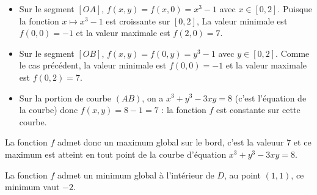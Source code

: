 {\begin{enumerate}
\begin{enumerate}
{\begin{itemize}
    			\item Sur le segment $[OA]$, $f(x,y) = f(x,0) = x^3 - 1$ avec $x \in [0,2]$. Puisque la fonction $x \mapsto x^3-1$ est croissante sur $[0,2]$, La valeur minimale est $f(0,0) = -1$ et la valeur maximale est $f(2,0) = 7$. 
    			\item Sur le segment $[OB]$, $f(x,y) = f(0,y) = y^3 - 1$ avec $y \in [0,2]$. Comme le cas précédent, la valeur minimale est $f(0,0) = -1$ et la valeur maximale est $f(0,2) = 7$.
    			\item Sur la portion de courbe $(AB)$, on a $x^3 + y^3 - 3xy = 8$  (c'est l'équation de la courbe) donc $f(x,y) = 8-1 = 7$ : la fonction $f$ est constante sur cette courbe. 
    		\end{itemize}	
    	La fonction $f$ admet donc un maximum global sur le bord, c'est la valeuur $7$ et ce maximum est atteint en tout point de la courbe d'équation $x^3 + y^3 - 3xy = 8$. 
    	
    	La fonction $f$ admet un minimum global à l'intérieur de $D$, au point $(1,1)$, ce minimum vaut $-2$.
     }
    \end{enumerate}
\end{enumerate}}
